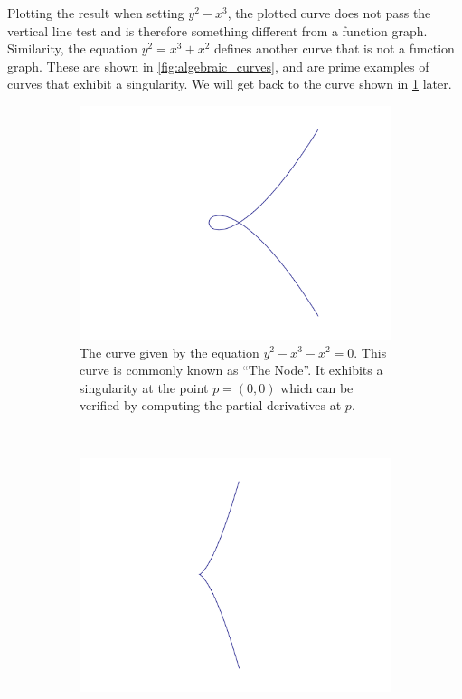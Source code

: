 \documentclass{article}
\begin{document}
    Plotting the result when setting $y^2 - x^3$, the plotted curve does not
    pass the vertical line test and is therefore something different from a
    function graph. Similarity, the equation $y^2 = x^3 + x^2$ defines another
    curve that is not a function graph. These are shown in
    \cref{fig:algebraic_curves}, and are prime examples of curves that exhibit
    a singularity. We will get back to the curve shown in \cref{fig:node}
    later.

    \begin{figure}[h!]
        \centering
        \begin{subfigure}[t]{0.45\textwidth}
            \includegraphics[width=\textwidth]{pictures/node.pdf}
            \caption{The curve given by the equation $y^2 - x^3 - x^2 = 0$.
            This curve is commonly known as ``The Node''. It exhibits a
            singularity at the point $p = (0, 0)$ which can be verified by
            computing the partial derivatives at $p$.}
            \label{fig:node}
        \end{subfigure}        
        ~
        \begin{subfigure}[t]{0.45\textwidth}
            \includegraphics[width=\textwidth]{pictures/cusp.pdf}

\end{subfigure}
\end{figure}
\end{document}

